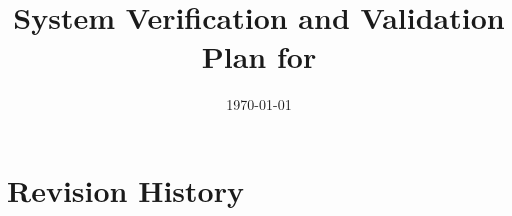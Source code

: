 \documentclass[12pt, titlepage]{article}
\begin{document}
\title{%
  System Verification and Validation Plan for \progname{}}
\author{\authname}
\date{\today}

\maketitle


\tableofcontents

\listoftables


\newpage

\section{Revision History}
\end{document}
